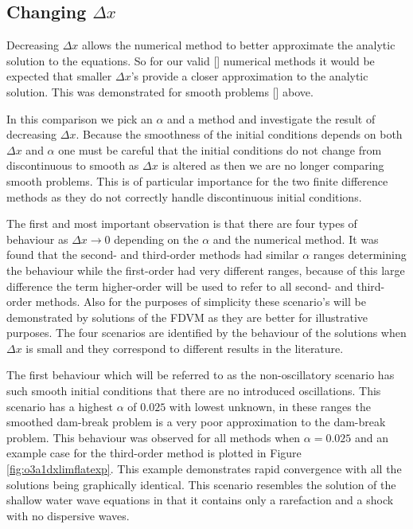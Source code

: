 \documentclass[SingleSpace,12pt,Proceedings]{Serre_ASCE}
\begin{document}
\subsection{Changing $\Delta x$}
Decreasing $\Delta x$ allows the numerical method to better approximate the analytic solution to the equations. So for our valid [] numerical methods it would be expected that smaller $\Delta x$'s provide a closer approximation to the analytic solution. This was demonstrated for smooth problems [] above.

In this comparison we pick an $\alpha$ and a method and investigate the result of decreasing $\Delta x$. Because the smoothness of the initial conditions depends on both $\Delta x$ and $\alpha$ one must be careful that the initial conditions do not change from discontinuous to smooth as $\Delta x$ is altered as then we are no longer comparing smooth problems. This is of particular importance for the two finite difference methods as they do not correctly handle discontinuous initial conditions.

The first and most important observation is that there are four types of behaviour as $\Delta x \rightarrow 0$ depending on the $\alpha$ and the numerical method. It was found that the second- and third-order methods had similar $\alpha$ ranges determining the behaviour while the first-order had very different ranges, because of this large difference the term higher-order will be used to refer to all second- and third- order methods. Also for the purposes of simplicity these scenario's will be demonstrated by solutions of the FDVM as they are better for illustrative purposes. The four scenarios are identified by the behaviour of the solutions when $\Delta x$ is small and they correspond to different results in the literature. 

The first behaviour which will be referred to as the non-oscillatory scenario has such smooth initial conditions that there are no introduced oscillations. This scenario has a highest $\alpha$ of $0.025$ with lowest unknown, in these ranges the smoothed dam-break problem is a very poor approximation to the dam-break problem. This behaviour was observed for all methods when $\alpha = 0.025$ and an example case for the third-order method is plotted in Figure \ref{fig:o3a1dxlimflatexp}. This example demonstrates rapid convergence with all the solutions being graphically identical. This scenario resembles the solution of the shallow water wave equations in that it contains only a rarefaction and a shock with no dispersive waves.
\end{document}
